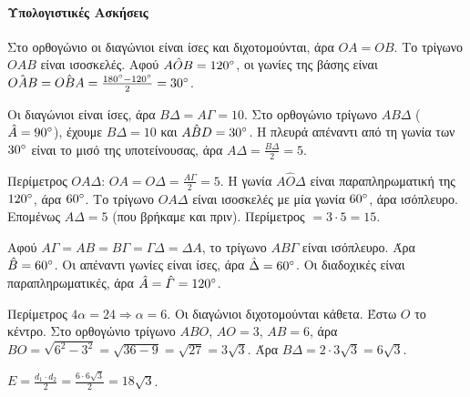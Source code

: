 \documentclass[11pt,a4paper,modern]{FFExercises}
\begin{document}

\paragraph{Υπολογιστικές Ασκήσεις}

\begin{alist}
    \item Στο ορθογώνιο οι διαγώνιοι είναι ίσες και διχοτομούνται, άρα $OA=OB$. Το τρίγωνο $OAB$ είναι ισοσκελές. Αφού $A\hat{O}B = 120\degree$, οι γωνίες της βάσης είναι $\hat{OAB} = \hat{OBA} = \frac{180\degree - 120\degree}{2} = 30\degree$.
    \item Οι διαγώνιοι είναι ίσες, άρα $B\Delta = A\varGamma = 10$. Στο ορθογώνιο τρίγωνο $AB\Delta$ ($\hat{A}=90\degree$), έχουμε $B\Delta = 10$ και $\hat{ABD} = 30\degree$. Η πλευρά απέναντι από τη γωνία των $30\degree$ είναι το μισό της υποτείνουσας, άρα $A\Delta = \frac{B\Delta}{2} = 5$.
    \item Περίμετρος $OA\Delta$: $OA = O\Delta = \frac{A\varGamma}{2} = 5$. Η γωνία $A\hat{O}\Delta$ είναι παραπληρωματική της $120\degree$, άρα $60\degree$. Το τρίγωνο $OA\Delta$ είναι ισοσκελές με μία γωνία $60\degree$, άρα ισόπλευρο. Επομένως $A\Delta = 5$ (που βρήκαμε και πριν). Περίμετρος $= 3 \cdot 5 = 15$.
\end{alist}

\begin{alist}
    \item Αφού $A\varGamma = AB = B\varGamma = \varGamma\Delta = \Delta A$, το τρίγωνο $AB\varGamma$ είναι ισόπλευρο. Άρα $\hat{B} = 60\degree$. Οι απέναντι γωνίες είναι ίσες, άρα $\hat{\Delta} = 60\degree$. Οι διαδοχικές είναι παραπληρωματικές, άρα $\hat{A} = \hat{\varGamma} = 120\degree$.
    \item Περίμετρος $4\alpha = 24 \Rightarrow \alpha = 6$. Οι διαγώνιοι διχοτομούνται κάθετα. Έστω $O$ το κέντρο. Στο ορθογώνιο τρίγωνο $ABO$, $AO = 3$, $AB=6$, άρα $BO = \sqrt{6^2 - 3^2} = \sqrt{36-9} = \sqrt{27} = 3\sqrt{3}$. Άρα $B\Delta = 2 \cdot 3\sqrt{3} = 6\sqrt{3}$.
    \item $E = \frac{d_1 \cdot d_2}{2} = \frac{6 \cdot 6\sqrt{3}}{2} = 18\sqrt{3}$.
\end{alist}
\end{document}
